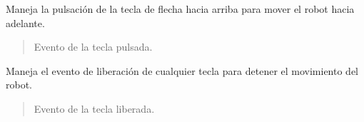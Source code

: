 \documentclass[a4paper,10pt,spanish]{sphinxmanual}
\begin{document}
\begin{fulllineitems}
\begin{fulllineitems}
\label{\detokenize{squad_state_manager:squad_interfaz.InterfazManager.on_arrow_up}}
\pysigstartsignatures
{}
\pysigstopsignatures
\sphinxAtStartPar
Maneja la pulsación de la tecla de flecha hacia arriba para mover el robot hacia adelante.
\begin{quote}\begin{description}
\sphinxAtStartPar
{} \textendash{} Evento de la tecla pulsada.

\end{description}\end{quote}

\end{fulllineitems}


\begin{fulllineitems}
\label{\detokenize{squad_state_manager:squad_interfaz.InterfazManager.on_closing}}
\pysigstartsignatures
{}
\pysigstopsignatures
\end{fulllineitems}


\begin{fulllineitems}
\label{\detokenize{squad_state_manager:squad_interfaz.InterfazManager.on_key_release}}
\pysigstartsignatures
{}
\pysigstopsignatures
\sphinxAtStartPar
Maneja el evento de liberación de cualquier tecla para detener el movimiento del robot.
\begin{quote}\begin{description}
\sphinxAtStartPar
{} \textendash{} Evento de la tecla liberada.

\end{description}\end{quote}

\end{fulllineitems}


\end{fulllineitems}
\end{document}
